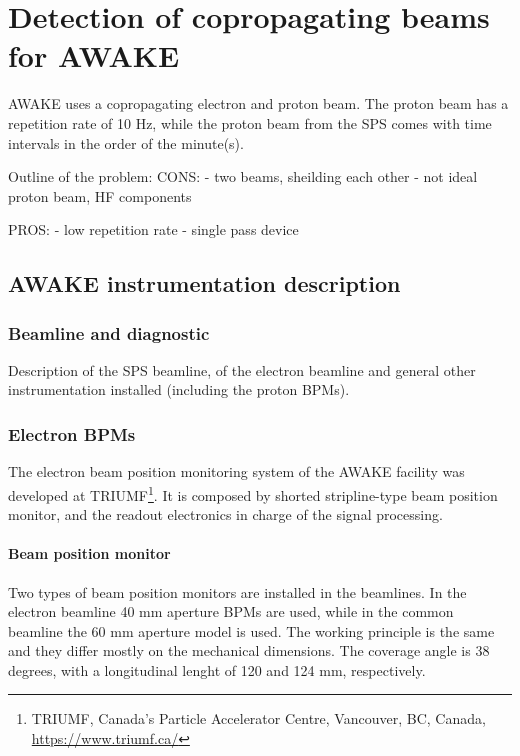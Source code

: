 \chapter[Detection of copropagating beams for AWAKE]{Detection of copropagating beams for AWAKE}

AWAKE uses a copropagating electron and proton beam. The proton beam has a repetition rate of 10 Hz, while the proton beam from the SPS comes with time intervals in the order of the minute(s).

Outline of the problem:
CONS:
- two beams, sheilding each other
- not ideal proton beam, HF components

PROS:
- low repetition rate
- single pass device

\section[AWAKE instrumentation description]{AWAKE instrumentation description}

\subsection[Beamline and diagnostic]{Beamline and diagnostic}

Description of the SPS beamline, of the electron beamline and general other instrumentation installed (including the proton BPMs).

\subsection[Electron BPMs]{Electron BPMs}

The electron beam position monitoring system of the AWAKE facility was developed at TRIUMF\footnote{TRIUMF, Canada's Particle Accelerator Centre, Vancouver, BC, Canada, \url{https://www.triumf.ca/}}. It is composed by shorted stripline-type beam position monitor, and the readout electronics in charge of the signal processing.

\subsubsection{Beam position monitor}

Two types of beam position monitors are installed in the beamlines. In the electron beamline 40 mm aperture BPMs are used, while in the common beamline the 60 mm aperture model is used. The working principle is the same and they differ mostly on the mechanical dimensions. The coverage angle is 38 degrees, with a longitudinal lenght of 120 and 124 mm, respectively.

